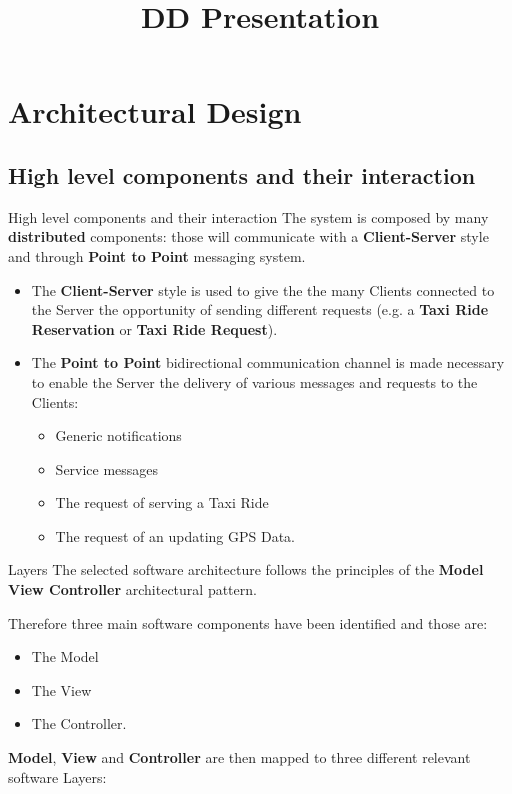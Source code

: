 \documentclass{../common/latex_classes/pdf_presentation}
\title{DD Presentation}
\begin{document}
	\titleToc{}
	\section{Architectural Design}
	
	\subsection{High level components and their interaction}
	
	\begin{frame}{High level components and their interaction}
		The system is composed by many \textbf{distributed} components: those will communicate with a \textbf{Client-Server} style and through \textbf{Point to Point} messaging system. 
		\begin{itemize}
			\item The \textbf{Client-Server} style is used to give the the many Clients connected to the Server the opportunity of sending different requests (e.g. a \textbf{Taxi Ride Reservation} or \textbf{Taxi Ride Request}).
			\item The \textbf{Point to Point} bidirectional communication channel is made necessary to enable the Server the delivery of various messages and requests to the Clients:
			\begin{itemize}
				\item Generic notifications
				\item Service messages
				\item The request of serving a Taxi Ride
				\item The request of an updating GPS Data.
			\end{itemize}
		\end{itemize}
	\end{frame}
	
	\begin{frame}{Layers}
		The selected software architecture follows the principles of the \textbf{Model View Controller} architectural pattern. 
		
		Therefore three main software components have been identified and those are:
		\begin{itemize}
			\item The Model
			\item The View 
			\item The Controller.
		\end{itemize}
		
		\textbf{Model}, \textbf{View} and \textbf{Controller} are then mapped to three different relevant software Layers:
	\end{frame}
	
\end{document}
